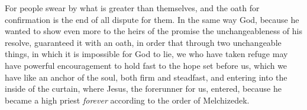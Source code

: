 \begin{biblechapter}
\verse For people swear by what is greater than themselves, and the oath for confirmation is the end of all dispute for them.
\verse In the same way God, because he wanted to show even more to the heirs of the promise the unchangeableness of his resolve, guaranteed it with an oath,
\verse in order that through two unchangeable things, in which it is impossible for God to lie, we who have taken refuge may have powerful encouragement to hold fast to the hope set before us,
\verse which we have like an anchor of the soul, both firm and steadfast, and entering into the inside of the curtain,
\verse where Jesus, the forerunner for us, entered, because he became a high priest \textit{forever} according to the order of Melchizedek.
\end{biblechapter}

